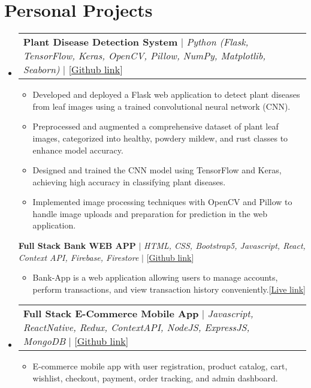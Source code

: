 \documentclass[letterpaper,11pt]{article}
\makeatletter
\newcommand{\resumeItem}[1]{
  \item\small{
    {#1 \vspace{-2pt}}
  }
}
\newcommand{\resumeProjectHeading}[2]{
    \item
    \begin{tabular*}{0.97\textwidth}{l@{\extracolsep{\fill}}r}
      \small#1 & #2 \\
    \end{tabular*}\vspace{-7pt}
}
\newcommand{\resumeSubHeadingListStart}{\begin{itemize}[leftmargin=0.15in, label={}]}
\newcommand{\resumeSubHeadingListEnd}{\end{itemize}}
\newcommand{\resumeItemListStart}{\begin{itemize}}
\newcommand{\resumeItemListEnd}{\end{itemize}\vspace{-5pt}}
\makeatother
\begin{document}
\section{\textbf{Personal Projects}}
\resumeSubHeadingListStart
\resumeProjectHeading
{\textbf{{Plant Disease Detection System}} $|$ \emph{Python (Flask, TensorFlow, Keras, OpenCV, Pillow, NumPy, Matplotlib, Seaborn)} $|$ [{\href{https://github.com/Ahmadjajja/E_Commerce_Mobile_App_Frontend}{\underline{Github link}}}]}{}
\resumeItemListStart
\resumeItem{Developed and deployed a Flask web application to detect plant diseases from leaf images using a trained convolutional neural network (CNN).}
\resumeItem{Preprocessed and augmented a comprehensive dataset of plant leaf images, categorized into healthy, powdery mildew, and rust classes to enhance model accuracy.}
\resumeItem{Designed and trained the CNN model using TensorFlow and Keras, achieving high accuracy in classifying plant diseases.}
\resumeItem{Implemented image processing techniques with OpenCV and Pillow to handle image uploads and preparation for prediction in the web application.}
\resumeItemListEnd
{\textbf{{Full Stack Bank WEB APP}} $|$ \emph{HTML, CSS, Bootstrap5, Javascript, React, Context API, Firebase, Firestore} $|$ [{\href{https://github.com/Ahmadjajja/React_Bank}{\underline{Github link}}}]}{}
\resumeItemListStart
\resumeItem{Bank-App is a web application allowing users to manage accounts, perform
  transactions, and view transaction history conveniently.[{\href{https://jajja-bank-app.web.app/}{\underline{Live link}}}]}
\resumeItemListEnd
\resumeProjectHeading
{\textbf{{Full Stack E-Commerce Mobile App}} $|$ \emph{Javascript, ReactNative, Redux, ContextAPI, NodeJS,
    ExpressJS, MongoDB} $|$ [{\href{https://github.com/Ahmadjajja/E_Commerce_Mobile_App_Frontend}{\underline{Github link}}}]}{}
\resumeItemListStart
\resumeItem{E-commerce mobile app with user registration, product catalog, cart, wishlist,
  checkout, payment, order tracking, and admin dashboard.}
\resumeItemListEnd
\resumeSubHeadingListEnd


\end{document}

